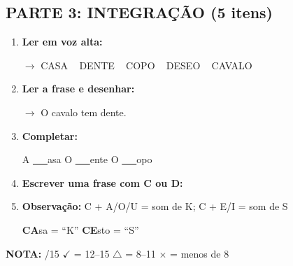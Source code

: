 \begin{exercicio}
\subsection*{PARTE 3: INTEGRAÇÃO (5 itens)}

\begin{enumerate}[resume]
  \item \textbf{Ler em voz alta:}
  \begin{center}
  $\rightarrow$ CASA  ~  DENTE  ~  COPO  ~  DESEO  ~  CAVALO
  \end{center}

  \item \textbf{Ler a frase e desenhar:}
  \begin{center}
  $\rightarrow$ O cavalo tem dente.
  \end{center}
  \begin{center}
  \end{center}

  \item \textbf{Completar:}
  \begin{center}
  A \underline{~~~}asa \quad O \underline{~~~}ente \quad O \underline{~~~}opo
  \end{center}

  \item \textbf{Escrever uma frase com C ou D:}
  \begin{center}
  \underline{\hspace{12cm}}
  \end{center}

  \item \textbf{Observação:} C + A/O/U = som de K; C + E/I = som de S
  \begin{center}
  \textbf{CA}sa = ``K'' \quad \textbf{CE}sto = ``S''
  \end{center}
\end{enumerate}

\noindent\textbf{NOTA:} \underline{\hspace{1cm}}/15 \quad $\checkmark$ = 12--15 \quad $\triangle$ = 8--11 \quad $\times$ = menos de 8
\end{exercicio}

